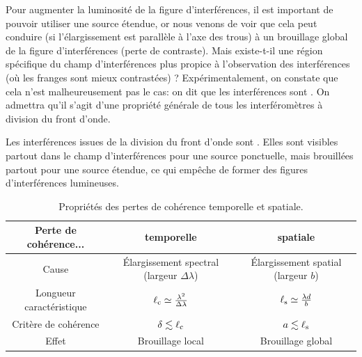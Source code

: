\documentclass[12pt,fancy]{cours}
\begin{document}
Pour augmenter la luminosité de la figure d'interférences, il est important de pouvoir utiliser une source étendue, or nous venons de voir que cela peut conduire (si l'élargissement est parallèle à l'axe des trous) à un brouillage global de la figure d'interférences (perte de contraste). Mais existe-t-il une région spécifique du champ d'interférences plus propice à l'observation des interférences (où les franges sont mieux contrastées) ? Expérimentalement, on constate que cela n'est malheureusement pas le cas: on dit que les interférences sont . On admettra qu'il s'agit d'une propriété générale de tous les interféromètres à division du front d'onde.

\begin{prop}\label{prop:}
Les interférences issues de la division du front d'onde sont . Elles sont visibles partout dans le champ d'interférences pour une source ponctuelle, mais brouillées partout pour une source étendue, ce qui empêche de former des figures d'interférences lumineuses.
\end{prop}


\begin{table}[h!] \centering
  \renewcommand{\arraystretch}{1.4}
  \begin{tabular}{|c|c|c|} \hline \textbf{Perte de cohérence...} & \textbf{temporelle} & \textbf{spatiale} \\ 
  \hline \hline 
  Cause & Élargissement spectral (largeur $\Delta \lambda$) & Élargissement spatial (largeur $b$) \\ \hline
  Longueur caractéristique & $\ell_{\rm c} \simeq \frac{\lambda^2}{\Delta \lambda}$ & $\ell_{\rm s} \simeq \frac{\lambda d}{b}$ \\ \hline 
  Critère de cohérence & $\delta \lesssim \ell_{\rm c}$ & $a \lesssim \ell_{\rm s}$ \\ \hline 
  Effet & Brouillage local & Brouillage global \\ \hline 
  
\end{tabular} \caption{Propriétés des pertes de cohérence temporelle et spatiale.} \label{tab:proprietes} \end{table}
\end{document}
